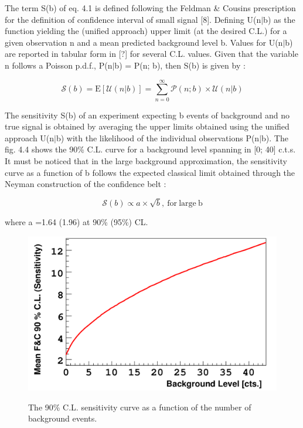 \documentclass[main.tex]{subfiles}
\begin{document}
\NI The term S(b) of eq. 4.1 is defined following the Feldman \& Cousins prescription for the definition of confidence interval of small signal [8]. Defining U(n$|$b) as the function yielding the (unified approach) upper limit (at the desired C.L.) for a given observation n and a mean predicted background level b. Values for U(n$|$b) are reported in tabular form in [?] for several C.L. values. Given that the variable n follows a Poisson p.d.f., P(n$|$b) = P(n; b), then S(b) is given by : 


\begin{equation}
\mathcal{S}(b) = \text{E}[\mathcal{U}(n|b)] = \sum_{n=0}^{\infty} \mathcal{P} (n;b) \times \mathcal{U}(n|b)
\end{equation}


\NI The sensitivity S(b) of an experiment expecting b events of background and no true signal is obtained by averaging the upper limits obtained using the unified approach U(n$|$b) with the likelihood of the individual observations P(n$|$b). The fig. 4.4 shows the 90\% C.L. curve for a background level spanning in [0; 40] c.t.s. It must be noticed that in the large background approximation, the sensitivity curve as a function of b follows the expected classical limit obtained through the Neyman construction of the confidence belt :


\begin{equation}
\mathcal{S}(b) \propto a \times \sqrt{b}, ~\text{for}~\text{large}~\text{b} 	
\end{equation}


\bigskip


\NI where a =1.64 (1.96) at 90\% (95\%) CL.


\begin{figure}[h!]
\centering
\includegraphics[scale=0.22]{pictures/Chap4/FeldmanAndCousin.png}
\label{FeldmanAndCousin.png}
\caption{The 90\% C.L. sensitivity curve as a function of the number of background events.}
\end{figure}
\end{document}
